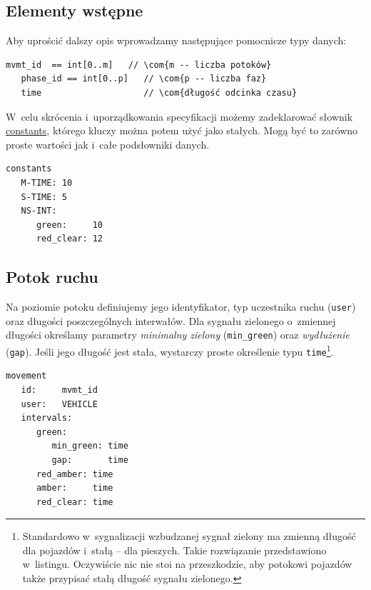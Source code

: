 \documentclass{pracamgr}
\theoremstyle{plain}
\newcommand{\com}[1]{\upshape\color{light-gray}{#1}}
\begin{document}
\subsection{Elementy wstępne}
Aby uprościć dalszy opis wprowadzamy następujące pomocnicze typy danych:
\begin{lstlisting}[caption=Pomocnicze typy danych.]
   mvmt_id  == int[0..m]   // \com{m -- liczba potoków}
   phase_id == int[0..p]   // \com{p -- liczba faz}
   time                    // \com{długość odcinka czasu}
\end{lstlisting}

W~celu skrócenia i~uporządkowania specyfikacji możemy zadeklarować słownik
\url{constants}, którego kluczy można potem użyć jako stałych. Mogą
być to zarówno proste wartości jak i~całe podsłowniki danych.

\noindent\begin{minipage}{1.0\linewidth}
\begin{lstlisting}[caption=Słownik stałych.]
constants
   M-TIME: 10
   S-TIME: 5
   NS-INT:
      green:     10
      red_clear: 12
\end{lstlisting}
\end{minipage}

\subsection{Potok ruchu}
Na poziomie potoku definiujemy jego identyfikator, typ uczestnika
ruchu (\texttt{user}) oraz długości poszczególnych interwałów.  Dla
sygnału zielonego o~zmiennej długości określamy parametry
\emph{minimalny zielony} (\texttt{min\_green}) oraz \emph{wydłużenie}
(\texttt{gap}). Jeśli jego długość jest stała, wystarczy proste
określenie typu \texttt{time}\footnote{Standardowo w~sygnalizacji
  wzbudzanej sygnał zielony ma zmienną długość dla pojazdów i~stałą --
dla pieszych. Takie rozwiązanie przedstawiono w~listingu. Oczywiście
nic nie stoi na przeszkodzie, aby potokowi pojazdów także przypisać
stałą długość sygnału zielonego.}.

\noindent\begin{minipage}{1.0\linewidth}
\begin{lstlisting}[caption=Schemat opisu potoku pojazdów.]
movement
   id:     mvmt_id
   user:   VEHICLE
   intervals:
      green:
         min_green: time
         gap:       time
      red_amber: time
      amber:     time
      red_clear: time
\end{lstlisting}
\end{minipage}
\end{document}
